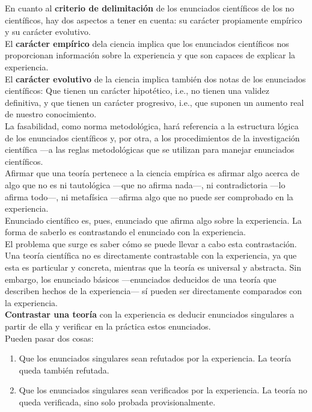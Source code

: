 \documentclass[a4paper, 11pt, twocolumn, spanish]{article}
\begin{document}
En cuanto al \textbf{criterio de delimitación} de los enunciados científicos
de los no científicos, hay dos aspectos a tener en cuenta: su carácter
propiamente empírico y su carácter evolutivo.\\[0pt]
El \textbf{carácter empírico} dela ciencia implica que los enunciados
científicos nos proporcionan información sobre la experiencia y que
son capaces de explicar la experiencia.\\[0pt]
El \textbf{carácter evolutivo} de la ciencia implica también dos notas de los
enunciados científicos: Que tienen un carácter hipotético, i.e., no
tienen una validez definitiva, y que tienen un carácter progresivo,
i.e., que suponen un aumento real de nuestro conocimiento.\\[0pt]

La fasabilidad, como norma metodológica, hará referencia a la
estructura lógica de los enunciados científicos y, por otra, a los
procedimientos de la investigación científica —a las reglas
metodológicas que se utilizan para manejar enunciados científicos. \\[0pt]
Afirmar que una teoría pertenece a la ciencia empírica es afirmar algo
acerca de algo que no es ni tautológica —que no afirma nada—, ni
contradictoria —lo afirma todo—, ni metafísica —afirma algo que no
puede ser comprobado en la experiencia.\\[0pt]
Enunciado científico es, pues, enunciado que afirma algo sobre la
experiencia. La forma de saberlo es contrastando el enunciado con la
experiencia.\\[0pt]
El problema que surge es saber cómo se puede llevar a cabo esta
contrastación.\\[0pt]

Una teoría científica no es directamente contrastable con la
experiencia, ya que esta es particular y concreta, mientras que la
teoría es universal y abstracta. Sin embargo, los enunciado básicos
—enunciados deducidos de una teoría que describen hechos de la
experiencia— sí pueden ser directamente comparados con la
experiencia.\\[0pt]
\textbf{Contrastar una teoría} con la experiencia es deducir enunciados
singulares a partir de ella y verificar en la práctica estos
enunciados. \\[0pt]
Pueden pasar dos cosas:
\begin{enumerate}
\item Que los enunciados singulares sean refutados por la
experiencia. La teoría queda también refutada.
\item Que los enunciados singulares sean verificados por la
experiencia. La teoría no queda verificada, sino solo probada
provisionalmente.
\end{enumerate}
\end{document}
